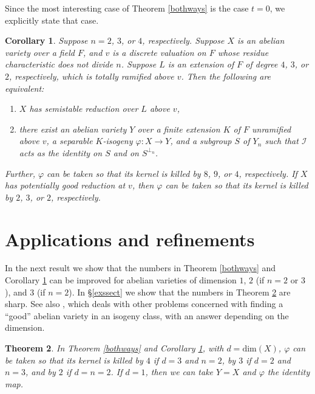 \documentclass{amsart}
\def\I{{\mathcal I}}
\def\dim{\mathrm{dim}}
\newtheorem{thm}{Theorem}[section]
\newtheorem{cor}[thm]{Corollary}
\theoremstyle{definition}
\begin{document}
Since the most interesting case of 
Theorem \ref{bothways} is the case $t = 0$, we explicitly 
state that case.

\begin{cor}
\label{bothcor}
Suppose $n = 2$, $3$, or $4$, respectively. Suppose  
$X$ is an abelian variety over a field $F$, and 
$v$ is a discrete valuation on $F$ whose residue characteristic 
does not divide $n$. 
Suppose
$L$ is an extension of $F$ of degree $4$, $3$, or
$2$, respectively, which 
is totally ramified above $v$. 
Then the following are equivalent:
\begin{enumerate}
\item[(i)] $X$ has semistable reduction over $L$ above $v$,
\item[(ii)] there exist an abelian variety $Y$ over a finite
extension $K$ of $F$ unramified above $v$, a separable
$K$-isogeny $\varphi : X \to Y$, 
and a subgroup 
$S$ of $Y_n$ such that 
$\I$ acts as the identity on $S$ and 
on $S^{\perp_n}$.
\end{enumerate}
Further, $\varphi$ can be taken so that
its kernel is killed by $8$, $9$, or $4$, respectively.
If $X$ has potentially good reduction at $v$, then $\varphi$ 
can be taken so that its kernel is killed by $2$, $3$, or
$2$, respectively.
\end{cor}

\section{Applications and refinements}
\label{appsect}

In the next result we show that the numbers in Theorem \ref{bothways}
and Corollary \ref{bothcor} can be improved for abelian varieties
of dimension $1$, $2$ (if $n = 2$ or $3$), and $3$ (if $n = 2$).
In \S\ref{exssect} we show that the numbers in Theorem \ref{ellcor} 
are sharp. See also \cite{Katz}, which deals with other 
problems concerned with finding a ``good'' abelian variety in an isogeny
class, with an answer depending on the dimension.

\begin{thm}
\label{ellcor}
In Theorem \ref{bothways} and Corollary \ref{bothcor},
with $d = \dim(X)$, 
$\varphi$ can be taken so that its kernel is killed
by $4$ if $d = 3$ and $n = 2$,
by $3$ if $d =2$ and $n = 3$, and 
by $2$ if $d = n = 2$. If $d = 1$, then we can take
$Y = X$ and $\varphi$ the identity map.
\end{thm}
\end{document}
